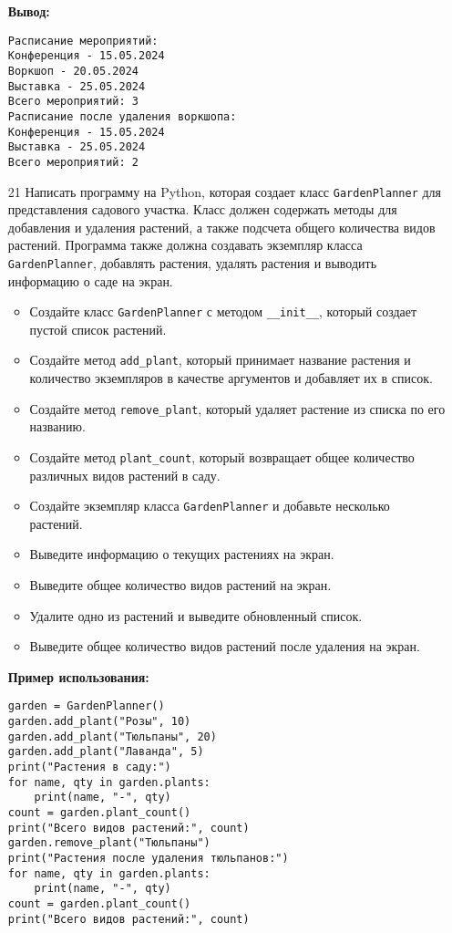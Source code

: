 \begin{enumerate}
\textbf{Вывод:}
\begin{verbatim}
Расписание мероприятий:
Конференция - 15.05.2024
Воркшоп - 20.05.2024
Выставка - 25.05.2024
Всего мероприятий: 3
Расписание после удаления воркшопа:
Конференция - 15.05.2024
Выставка - 25.05.2024
Всего мероприятий: 2
\end{verbatim}

\item[21] Написать программу на Python, которая создает класс \texttt{GardenPlanner} для представления садового участка. Класс должен содержать методы для добавления и удаления растений, а также подсчета общего количества видов растений. Программа также должна создавать экземпляр класса \texttt{GardenPlanner}, добавлять растения, удалять растения и выводить информацию о саде на экран.

\begin{itemize}
    \item Создайте класс \texttt{GardenPlanner} с методом \texttt{\_\_init\_\_}, который создает пустой список растений.
    \item Создайте метод \texttt{add\_plant}, который принимает название растения и количество экземпляров в качестве аргументов и добавляет их в список.
    \item Создайте метод \texttt{remove\_plant}, который удаляет растение из списка по его названию.
    \item Создайте метод \texttt{plant\_count}, который возвращает общее количество различных видов растений в саду.
    \item Создайте экземпляр класса \texttt{GardenPlanner} и добавьте несколько растений.
    \item Выведите информацию о текущих растениях на экран.
    \item Выведите общее количество видов растений на экран.
    \item Удалите одно из растений и выведите обновленный список.
    \item Выведите общее количество видов растений после удаления на экран.
\end{itemize}

\textbf{Пример использования:}

\begin{verbatim}
garden = GardenPlanner()
garden.add_plant("Розы", 10)
garden.add_plant("Тюльпаны", 20)
garden.add_plant("Лаванда", 5)
print("Растения в саду:")
for name, qty in garden.plants:
    print(name, "-", qty)
count = garden.plant_count()
print("Всего видов растений:", count)
garden.remove_plant("Тюльпаны")
print("Растения после удаления тюльпанов:")
for name, qty in garden.plants:
    print(name, "-", qty)
count = garden.plant_count()
print("Всего видов растений:", count)
\end{verbatim}


\end{enumerate}
